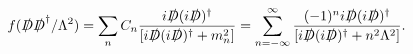 \begin{equation}
f({D\kern-0.15em\raise0.17ex\llap{/}\kern0.15em\relax}
{{D\kern-0.15em\raise0.17ex\llap{/}\kern0.15em\relax}}^\dagger/\Lambda^2)
=\sum_n C_n{{i{D\kern-0.15em\raise0.17ex\llap{/}\kern0.15em\relax}
({i{D\kern-0.15em\raise0.17ex\llap{/}\kern0.15em\relax}})^\dagger}
\over{[i{D\kern-0.15em\raise0.17ex\llap{/}\kern0.15em\relax}
{(i{D\kern-0.15em\raise0.17ex\llap{/}\kern0.15em\relax})^\dagger}
+ m^2_n]}} =\sum^{\infty}_{n= -\infty} {{(-1)^n
i{D\kern-0.15em\raise0.17ex\llap{/}\kern0.15em\relax}
({i{D\kern-0.15em\raise0.17ex\llap{/}\kern0.15em\relax}})^\dagger}
\over{[i{D\kern-0.15em\raise0.17ex\llap{/}\kern0.15em\relax}
{(i{D\kern-0.15em\raise0.17ex\llap{/}\kern0.15em\relax})^\dagger}
+ n^2\Lambda^2]}}.
\end{equation}

